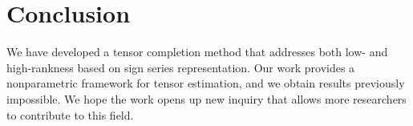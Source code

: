\documentclass[useAMS,usenatbib,usegraphicx,referee]{biom}
\theoremstyle{plain}
\theoremstyle{definition}
\begin{document}
\section{Conclusion}
We have developed a tensor completion method that addresses both low- and high-rankness based on sign series representation. Our work provides a nonparametric framework for tensor estimation, and we obtain results  previously impossible.  We hope the work opens up new inquiry that allows more researchers to contribute to this field.
\label{lastpage}

\newpage
\begingroup\footnotesize
\let\section\section
\makeatletter
\makeatother


\endgroup
\end{document}

